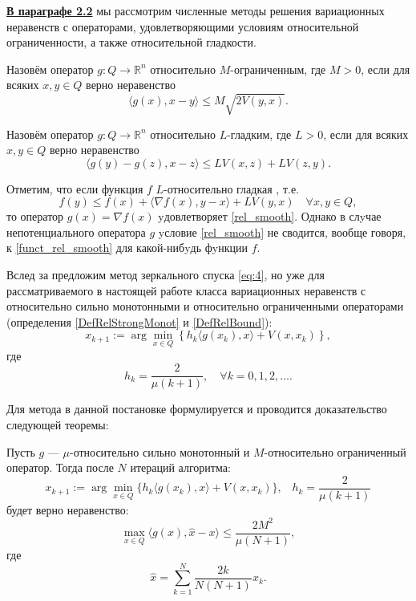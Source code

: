 \underline{\textbf{В параграфе 2.2}} мы рассмотрим численные методы решения вариационных неравенств с операторами, удовлетворяющими условиям относительной ограниченности, а также относительной гладкости.
\begin{definition}\label{DefRelBound}\cite{Main}
    Назовём оператор $g: Q \longrightarrow \mathbb{R}^n$ относительно $M$-огранич\-енным, где $M >0$, если для всяких $x, y \in Q$ верно неравенство
    \begin{equation}\label{rel_bound}
         \langle g(x), x - y \rangle \leq M\sqrt{2V(y,x)}.
     \end{equation}
\end{definition}
\begin{definition}\cite{Inex}
    Назовём оператор $g: Q \longrightarrow \mathbb{R}^n$ относительно $L$-гладким, где $L > 0$, если для всяких $x, y \in Q$ верно неравенство
    \begin{equation}\label{rel_smooth}
        \langle g(y)-g(z),x-z\rangle \leq LV(x,z) + LV(z,y).
    \end{equation}
\end{definition}
Отметим, что если функция $f$ $L$-относительно гладкая \cite{Bauschke}, т.е.
\begin{equation}\label{funct_rel_smooth}
    f(y) \leq f(x) + \langle \nabla f(x), y - x\rangle + LV(y, x) \quad \forall x, y \in Q,
\end{equation}
то оператор $g(x) = \nabla f(x)$ yдовлетворяет \eqref{rel_smooth}. Однако в слyчае непотенциального оператора $g$ yсловие \eqref{rel_smooth} не сводится, вообще говоря, к \eqref{funct_rel_smooth} для какой-нибyдь фyнкции $f$.


Вслед за \cite{Bach_2012} предложим метод зеркального спуска \eqref{eq:4}, но уже для рассматриваемого в настоящей работе класса  вариационных неравенств с относительно сильно монотонными и относительно ограниченными операторами (определения \ref{DefRelStrongMonot} и \ref{DefRelBound}):
\begin{equation} \label{eq:4}
    x_{k+1} := \arg \min_{x \in Q} \left\{ h_k \langle g(x_k), x \rangle + V(x, x_k)\right\},
\end{equation}
где
$$
    h_k = \frac{2}{\mu(k+1)},\quad  \forall k= 0,1, 2, \ldots.
$$

Для метода в данной постановке формулируется и проводится доказательство следующей теоремы:
\begin{theorem}\label{thm_MD_VI}
    Пусть $g$ --- $\mu$-относительно сильно монотонный и $M$-относитель\-но ограниченный оператор. Тогда после $N$ итераций алгоритма: 
    $$ 
        x_{k+1} := \arg \min_{x \in Q} \{ h_k \langle g(x_k), x\rangle + V(x, x_k)\}, \;\;\; h_k = \frac{2}{\mu (k+1)}
    $$
    будет верно неравенство:
    \begin{equation}\label{eq:2}
        \max_{x \in Q} \langle g(x), \widehat{x} - x\rangle \leq \frac{2 M^2}{\mu (N+1)},
    \end{equation}
    где 
    $$
        \widehat{x} = \sum_{k=1}^{N} \frac{2 k}{N (N+1)} x_k.
    $$
\end{theorem}

